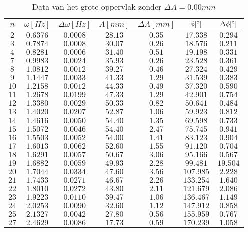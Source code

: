 \documentclass[12pt,a4]{article}
\begin{document}
\begin{table}[h]
\centering
\caption{Data van het grote oppervlak zonder $\Delta A = 0.00mm$}
\begin{tabular}{c | c | c | c | c | c | c }
$ n $&$\omega [Hz] $&$ \Delta\omega [Hz] $&$ A [mm] $&$ \Delta A [mm] $&$ \phi [\degree] $&$ \Delta \phi [\degree] $\\
\hline
$ 2 $&$ 0.6376 $&$ 0.0008 $&$ 28.13 $&$ 0.35 $&$ 17.338 $&$ 0.294 $\\
$ 3 $&$ 0.7874 $&$ 0.0008 $&$ 30.07 $&$ 0.26 $&$ 18.576 $&$ 0.211 $\\
$ 4 $&$ 0.8281 $&$ 0.0006 $&$ 31.40 $&$ 0.51 $&$ 19.198 $&$ 0.331 $\\
$ 7 $&$ 0.9983 $&$ 0.0024 $&$ 35.93 $&$ 0.26 $&$ 23.528 $&$ 0.361 $\\
$ 8 $&$ 1.0812 $&$ 0.0012 $&$ 39.27 $&$ 0.46 $&$ 27.324 $&$ 0.429 $\\
$ 9 $&$ 1.1447 $&$ 0.0033 $&$ 41.33 $&$ 1.29 $&$ 31.539 $&$ 0.383 $\\
$ 10 $&$ 1.2158 $&$ 0.0012 $&$ 44.33 $&$ 0.49 $&$ 37.320 $&$ 0.590 $\\
$ 11 $&$ 1.2678 $&$ 0.0199 $&$ 47.33 $&$ 1.29 $&$ 42.901 $&$ 0.754 $\\
$ 12 $&$ 1.3380 $&$ 0.0029 $&$ 50.33 $&$ 0.82 $&$ 50.641 $&$ 0.484 $\\
$ 13 $&$ 1.4020 $&$ 0.0207 $&$ 52.87 $&$ 1.06 $&$ 59.923 $&$ 0.812 $\\
$ 14 $&$ 1.4616 $&$ 0.0050 $&$ 54.40 $&$ 1.35 $&$ 69.598 $&$ 0.733 $\\
$ 15 $&$ 1.5072 $&$ 0.0046 $&$ 54.40 $&$ 2.47 $&$ 75.745 $&$ 0.941 $\\
$ 16 $&$ 1.5503 $&$ 0.0052 $&$ 54.00 $&$ 1.41 $&$ 83.123 $&$ 0.904 $\\
$ 17 $&$ 1.6013 $&$ 0.0062 $&$ 52.60 $&$ 1.55 $&$ 91.120 $&$ 0.704 $\\
$ 18 $&$ 1.6291 $&$ 0.0057 $&$ 50.67 $&$ 3.06 $&$ 95.166 $&$ 0.567 $\\
$ 19 $&$ 1.6882 $&$ 0.0059 $&$ 49.93 $&$ 2.28 $&$ 99.481 $&$ 19.504 $\\
$ 20 $&$ 1.7044 $&$ 0.0334 $&$ 47.60 $&$ 3.56 $&$ 107.985 $&$ 2.228 $\\
$ 21 $&$ 1.7433 $&$ 0.0271 $&$ 46.67 $&$ 2.26 $&$ 133.254 $&$ 1.640 $\\
$ 22 $&$ 1.8010 $&$ 0.0272 $&$ 43.80 $&$ 2.11 $&$ 121.679 $&$ 2.086 $\\
$ 23 $&$ 1.9223 $&$ 0.0110 $&$ 39.47 $&$ 1.06 $&$ 136.467 $&$ 1.149 $\\
$ 24 $&$ 2.0253 $&$ 0.0090 $&$ 32.60 $&$ 1.12 $&$ 147.912 $&$ 0.858 $\\
$ 25 $&$ 2.1327 $&$ 0.0042 $&$ 27.80 $&$ 0.56 $&$ 155.959 $&$ 0.767 $\\
$ 27 $&$ 2.4629 $&$ 0.0086 $&$ 17.73 $&$ 0.59 $&$ 170.239 $&$ 1.058 $\\
\end{tabular}
\end{table}
\end{document}
